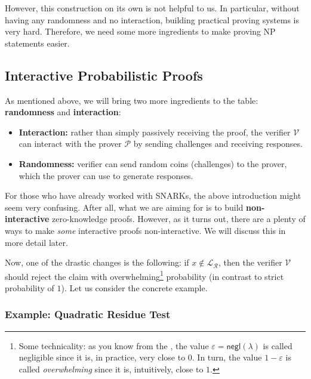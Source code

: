 \documentclass[../lecture-notes-148x210.tex]{subfiles}
\begin{document}
However, this construction on its own is not helpful to us. In particular, without having any randomness and no interaction, building practical proving systems is very hard. Therefore, we need some more ingredients to make proving NP statements easier.

\subsection{Interactive Probabilistic Proofs}

As mentioned above, we will bring two more ingredients to the table: \textbf{randomness} and \textbf{interaction}:
\begin{itemize}
    \item \textbf{Interaction:} rather than simply passively receiving the proof, the verifier $\mathcal{V}$ can interact with the prover $\mathcal{P}$ by sending challenges and receiving responses.
    \item \textbf{Randomness:} verifier can send random coins (challenges) to the prover, which the prover can use to generate responses.
\end{itemize}

\begin{remark}
    For those who have already worked with SNARKs, the above introduction might seem very confusing. After all, what we are aiming for is to build \textbf{non-interactive} zero-knowledge proofs. However, as it turns out, there are a plenty of ways to make \textit{some} interactive proofs non-interactive. We will discuss this in more detail later.
\end{remark}

Now, one of the drastic changes is the following: if $x \not\in
\mathcal{L}_{\mathcal{R}}$, then the verifier $\mathcal{V}$ should reject the
claim with overwhelming\footnote{Some technicality: as you know from the
, the value $\varepsilon =
\mathsf{negl}(\lambda)$ is called negligible since it is, in practice, very
close to $0$. In turn, the value $1-\varepsilon$ is called \textit{overwhelming}
since it is, intuitively, close to $1$.} probability (in contrast to strict
probability of $1$). Let us consider the concrete example.

\subsubsection{Example: Quadratic Residue Test}\label{section:quadratic_residue_test}
\end{document}
